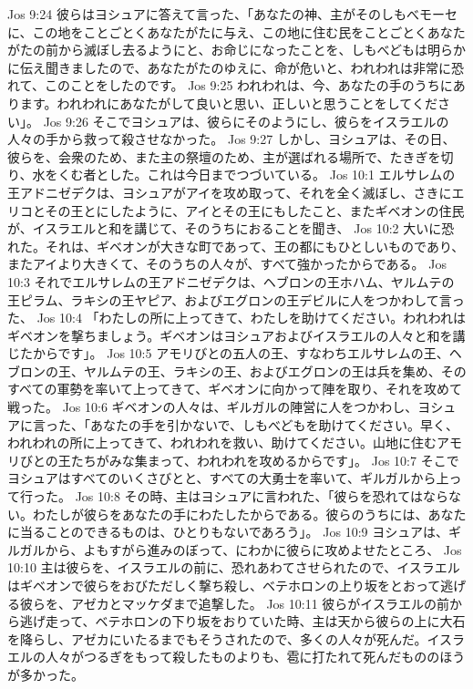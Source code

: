 Jos 9:24  彼らはヨシュアに答えて言った、「あなたの神、主がそのしもべモーセに、この地をことごとくあなたがたに与え、この地に住む民をことごとくあなたがたの前から滅ぼし去るようにと、お命じになったことを、しもべどもは明らかに伝え聞きましたので、あなたがたのゆえに、命が危いと、われわれは非常に恐れて、このことをしたのです。
Jos 9:25  われわれは、今、あなたの手のうちにあります。われわれにあなたがして良いと思い、正しいと思うことをしてください」。
Jos 9:26  そこでヨシュアは、彼らにそのようにし、彼らをイスラエルの人々の手から救って殺させなかった。
Jos 9:27  しかし、ヨシュアは、その日、彼らを、会衆のため、また主の祭壇のため、主が選ばれる場所で、たきぎを切り、水をくむ者とした。これは今日までつづいている。
Jos 10:1  エルサレムの王アドニゼデクは、ヨシュアがアイを攻め取って、それを全く滅ぼし、さきにエリコとその王とにしたように、アイとその王にもしたこと、またギベオンの住民が、イスラエルと和を講じて、そのうちにおることを聞き、
Jos 10:2  大いに恐れた。それは、ギベオンが大きな町であって、王の都にもひとしいものであり、またアイより大きくて、そのうちの人々が、すべて強かったからである。
Jos 10:3  それでエルサレムの王アドニゼデクは、ヘブロンの王ホハム、ヤルムテの王ピラム、ラキシの王ヤピア、およびエグロンの王デビルに人をつかわして言った、
Jos 10:4  「わたしの所に上ってきて、わたしを助けてください。われわれはギベオンを撃ちましょう。ギベオンはヨシュアおよびイスラエルの人々と和を講じたからです」。
Jos 10:5  アモリびとの五人の王、すなわちエルサレムの王、ヘブロンの王、ヤルムテの王、ラキシの王、およびエグロンの王は兵を集め、そのすべての軍勢を率いて上ってきて、ギベオンに向かって陣を取り、それを攻めて戦った。
Jos 10:6  ギベオンの人々は、ギルガルの陣営に人をつかわし、ヨシュアに言った、「あなたの手を引かないで、しもべどもを助けてください。早く、われわれの所に上ってきて、われわれを救い、助けてください。山地に住むアモリびとの王たちがみな集まって、われわれを攻めるからです」。
Jos 10:7  そこでヨシュアはすべてのいくさびとと、すべての大勇士を率いて、ギルガルから上って行った。
Jos 10:8  その時、主はヨシュアに言われた、「彼らを恐れてはならない。わたしが彼らをあなたの手にわたしたからである。彼らのうちには、あなたに当ることのできるものは、ひとりもないであろう」。
Jos 10:9  ヨシュアは、ギルガルから、よもすがら進みのぼって、にわかに彼らに攻めよせたところ、
Jos 10:10  主は彼らを、イスラエルの前に、恐れあわてさせられたので、イスラエルはギベオンで彼らをおびただしく撃ち殺し、ベテホロンの上り坂をとおって逃げる彼らを、アゼカとマッケダまで追撃した。
Jos 10:11  彼らがイスラエルの前から逃げ走って、ベテホロンの下り坂をおりていた時、主は天から彼らの上に大石を降らし、アゼカにいたるまでもそうされたので、多くの人々が死んだ。イスラエルの人々がつるぎをもって殺したものよりも、雹に打たれて死んだもののほうが多かった。
